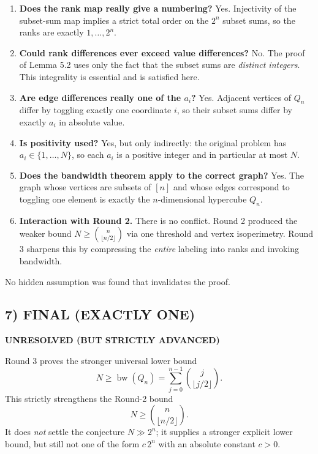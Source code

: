 \begin{enumerate}
\item \textbf{Does the rank map really give a numbering?} Yes. Injectivity of the subset-sum map implies a strict total order on the $2^n$ subset sums, so the ranks are exactly $1,\dots,2^n$.

\item \textbf{Could rank differences ever exceed value differences?} No. The proof of Lemma 5.2 uses only the fact that the subset sums are \emph{distinct integers}. This integrality is essential and is satisfied here.

\item \textbf{Are edge differences really one of the $a_i$?} Yes. Adjacent vertices of $Q_n$ differ by toggling exactly one coordinate $i$, so their subset sums differ by exactly $a_i$ in absolute value.

\item \textbf{Is positivity used?} Yes, but only indirectly: the original problem has $a_i\in\{1,\dots,N\}$, so each $a_i$ is a positive integer and in particular at most $N$.

\item \textbf{Does the bandwidth theorem apply to the correct graph?} Yes. The graph whose vertices are subsets of $[n]$ and whose edges correspond to toggling one element is exactly the $n$-dimensional hypercube $Q_n$.

\item \textbf{Interaction with Round 2.} There is no conflict. Round 2 produced the weaker bound $N\ge \binom{n}{\lfloor n/2\rfloor}$ via one threshold and vertex isoperimetry. Round 3 sharpens this by compressing the \emph{entire} labeling into ranks and invoking bandwidth.
\end{enumerate}

No hidden assumption was found that invalidates the proof.

\subsection{7) FINAL (EXACTLY ONE)}

\textbf{UNRESOLVED (BUT STRICTLY ADVANCED)}

Round 3 proves the stronger universal lower bound
\[
N\ge \operatorname{bw}(Q_n)=\sum_{j=0}^{n-1}\binom{j}{\lfloor j/2\rfloor}.
\]
This strictly strengthens the Round-2 bound
\[
N\ge \binom{n}{\lfloor n/2\rfloor}.
\]
It does \emph{not} settle the conjecture $N\gg 2^n$; it supplies a stronger explicit lower bound, but still not one of the form $c\,2^n$ with an absolute constant $c>0$.

